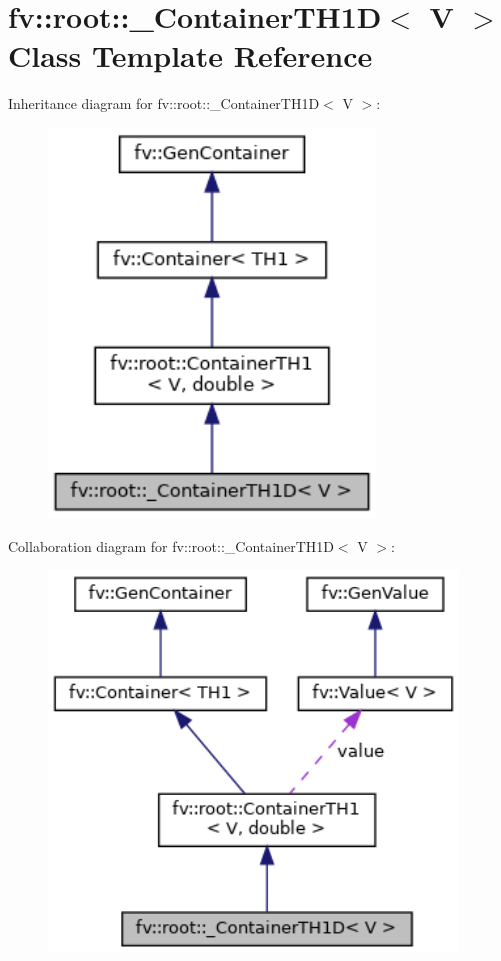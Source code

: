 \hypertarget{classfv_1_1root_1_1__ContainerTH1D}{}\section{fv\+:\+:root\+:\+:\+\_\+\+Container\+T\+H1D$<$ V $>$ Class Template Reference}
\label{classfv_1_1root_1_1__ContainerTH1D}


Inheritance diagram for fv\+:\+:root\+:\+:\+\_\+\+Container\+T\+H1D$<$ V $>$\+:
\nopagebreak
\begin{figure}[H]
\begin{center}
\leavevmode
\includegraphics[width=246pt]{classfv_1_1root_1_1__ContainerTH1D__inherit__graph}
\end{center}
\end{figure}


Collaboration diagram for fv\+:\+:root\+:\+:\+\_\+\+Container\+T\+H1D$<$ V $>$\+:
\nopagebreak
\begin{figure}[H]
\begin{center}
\leavevmode
\includegraphics[width=308pt]{classfv_1_1root_1_1__ContainerTH1D__coll__graph}
\end{center}
\end{figure}
